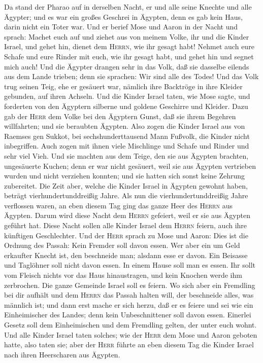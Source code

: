  Da stand der Pharao auf in derselben Nacht, er und alle
seine Knechte und alle Ägypter; und es war ein großes Geschrei in
Ägypten, denn es gab kein Haus, darin nicht ein Toter war.
 Und er berief Mose und Aaron in der Nacht und sprach:
Machet euch auf und ziehet aus von meinem Volke, ihr und die Kinder
Israel, und gehet hin, dienet dem \textsc{Herrn}, wie ihr gesagt habt!
 Nehmet auch eure Schafe und eure Rinder mit euch, wie
ihr gesagt habt, und gehet hin und segnet mich auch!  Und
die Ägypter drangen sehr in das Volk, daß sie dasselbe eilends aus dem
Lande trieben; denn sie sprachen: Wir sind alle des Todes!
 Und das Volk trug seinen Teig, ehe er gesäuert war,
nämlich ihre Backtröge in ihre Kleider gebunden, auf ihren Achseln.
 Und die Kinder Israel taten, wie Mose sagte, und
forderten von den Ägyptern silberne und goldene Geschirre und Kleider.
 Dazu gab der \textsc{Herr} dem Volke bei den Ägyptern
Gunst, daß sie ihrem Begehren willfahrten; und sie beraubten Ägypten.
 Also zogen die Kinder Israel aus von Raemses gen Sukkot,
bei sechshunderttausend Mann Fußvolk, die Kinder nicht inbegriffen.
 Auch zogen mit ihnen viele Mischlinge und Schafe und
Rinder und sehr viel Vieh.  Und sie machten aus dem
Teige, den sie aus Ägypten brachten, ungesäuerte Kuchen; denn er war
nicht gesäuert, weil sie aus Ägypten vertrieben wurden und nicht
verziehen konnten; und sie hatten sich sonst keine Zehrung zubereitet.
 Die Zeit aber, welche die Kinder Israel in Ägypten
gewohnt haben, beträgt vierhundertunddreißig Jahre.  Als
nun die vierhundertunddreißig Jahre verflossen waren, an eben diesem Tag
ging das ganze Heer des \textsc{Herrn} aus Ägypten. 
Darum wird diese Nacht dem \textsc{Herrn} gefeiert, weil er sie aus
Ägypten geführt hat. Diese Nacht sollen alle Kinder Israel dem
\textsc{Herrn} feiern, auch ihre künftigen Geschlechter. 
Und der \textsc{Herr} sprach zu Mose und Aaron: Dies ist die Ordnung des
Passah: Kein Fremder soll davon essen.  Wer aber ein um
Geld erkaufter Knecht ist, den beschneide man; alsdann esse er davon.
 Ein Beisasse und Taglöhner soll nicht davon essen.
 In einem Hause soll man es essen. Ihr sollt vom Fleisch
nichts vor das Haus hinaustragen, und kein Knochen werde ihm zerbrochen.
 Die ganze Gemeinde Israel soll es feiern.
 Wo sich aber ein Fremdling bei dir aufhält und dem
\textsc{Herrn} das Passah halten will, der beschneide alles, was
männlich ist; und dann erst mache er sich herzu, daß er es feiere und
sei wie ein Einheimischer des Landes; denn kein Unbeschnittener soll
davon essen.  Einerlei Gesetz soll dem Einheimischen und
dem Fremdling gelten, der unter euch wohnt.  Und alle
Kinder Israel taten solches; wie der \textsc{Herr} dem Mose und Aaron
geboten hatte, also taten sie;  aber der \textsc{Herr}
führte an eben diesem Tag die Kinder Israel nach ihren Heerscharen aus
Ägypten.

